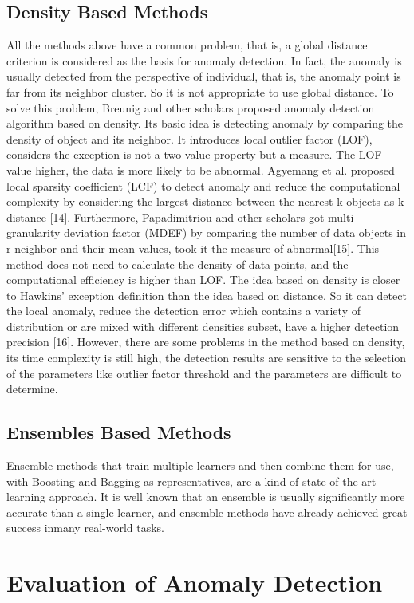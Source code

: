 \subsection{Density Based Methods}
All the methods above have a common problem,
that is,
a global distance criterion is considered as the basis for
anomaly detection.
In fact,
the anomaly is usually detected
from the perspective of individual,
that is,
the anomaly
point is far from its neighbor cluster.
So it is not appropriate
to use global distance.
To solve this problem,
Breunig and
other scholars proposed anomaly detection algorithm based
on density.
Its basic idea is detecting anomaly by comparing
the density of object and its neighbor.
It introduces local
outlier factor (LOF),
considers the exception is not a
two-value property but a measure.
The LOF value higher,
the data is more likely to be abnormal.
Agyemang et al.
proposed local sparsity coefficient (LCF) to detect anomaly
and reduce the computational complexity by considering
the largest distance between the nearest k objects as
k-distance [14].
Furthermore,
Papadimitriou and other
scholars got multi-granularity deviation factor (MDEF) by
comparing the number of data objects in r-neighbor and
their mean values,
took it the measure of abnormal[15].
This method does not need to calculate the density of data
points,
and the computational efficiency is higher than LOF.
The idea based on density is closer to Hawkins’ exception
definition than the idea based on distance.
So it can detect the local anomaly,
reduce the detection error which contains
a variety of distribution or are mixed with different
densities subset,
have a higher detection precision [16].
However,
there are some problems in the method based on
density,
its time complexity is still high,
the detection
results are sensitive to the selection of the parameters like
outlier factor threshold and the parameters are difficult to
determine.
\subsection{Ensembles Based Methods}

Ensemble methods that train multiple learners and then combine them for
use, 
with Boosting and Bagging as representatives, 
are a kind of state-of-the art
learning approach. 
It is well known that an ensemble is usually significantly
more accurate than a single learner, 
and ensemble methods have
already achieved great success inmany real-world tasks.

\section{Evaluation of Anomaly Detection}


